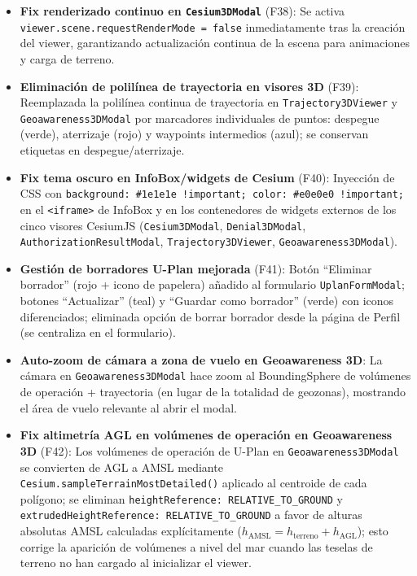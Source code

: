 \documentclass[12pt,a4paper]{article}
\begin{document}
\begin{itemize}
\begin{itemize}
\begin{itemize}
            \item \textbf{Fix renderizado continuo en \texttt{Cesium3DModal}} (F38): Se activa \texttt{viewer.scene.requestRenderMode = false} inmediatamente tras la creación del viewer, garantizando actualización continua de la escena para animaciones y carga de terreno.
            \item \textbf{Eliminación de polilínea de trayectoria en visores 3D} (F39): Reemplazada la polilínea continua de trayectoria en \texttt{Trajectory3DViewer} y \texttt{Geoawareness3DModal} por marcadores individuales de puntos: despegue (verde), aterrizaje (rojo) y waypoints intermedios (azul); se conservan etiquetas en despegue/aterrizaje.
            \item \textbf{Fix tema oscuro en InfoBox/widgets de Cesium} (F40): Inyección de CSS con \texttt{background: \#1e1e1e !important; color: \#e0e0e0 !important;} en el \texttt{<iframe>} de InfoBox y en los contenedores de widgets externos de los cinco visores CesiumJS (\texttt{Cesium3DModal}, \texttt{Denial3DModal}, \texttt{AuthorizationResultModal}, \texttt{Trajectory3DViewer}, \texttt{Geoawareness3DModal}).
            \item \textbf{Gestión de borradores U-Plan mejorada} (F41): Botón ``Eliminar borrador'' (rojo + icono de papelera) añadido al formulario \texttt{UplanFormModal}; botones ``Actualizar'' (teal) y ``Guardar como borrador'' (verde) con iconos diferenciados; eliminada opción de borrar borrador desde la página de Perfil (se centraliza en el formulario).
            \item \textbf{Auto-zoom de cámara a zona de vuelo en Geoawareness 3D}: La cámara en \texttt{Geoawareness3DModal} hace zoom al BoundingSphere de volúmenes de operación + trayectoria (en lugar de la totalidad de geozonas), mostrando el área de vuelo relevante al abrir el modal.
            \item \textbf{Fix altimetría AGL en volúmenes de operación en Geoawareness 3D} (F42): Los volúmenes de operación de U-Plan en \texttt{Geoawareness3DModal} se convierten de AGL a AMSL mediante \texttt{Cesium.sampleTerrainMostDetailed()} aplicado al centroide de cada polígono; se eliminan \texttt{heightReference: RELATIVE\_TO\_GROUND} y \texttt{extrudedHeightReference: RELATIVE\_TO\_GROUND} a favor de alturas absolutas AMSL calculadas explícitamente (\( h_{\text{AMSL}} = h_{\text{terreno}} + h_{\text{AGL}} \)); esto corrige la aparición de volúmenes a nivel del mar cuando las teselas de terreno no han cargado al inicializar el viewer.
        \end{itemize}

\end{itemize}
\end{itemize}
\end{document}
